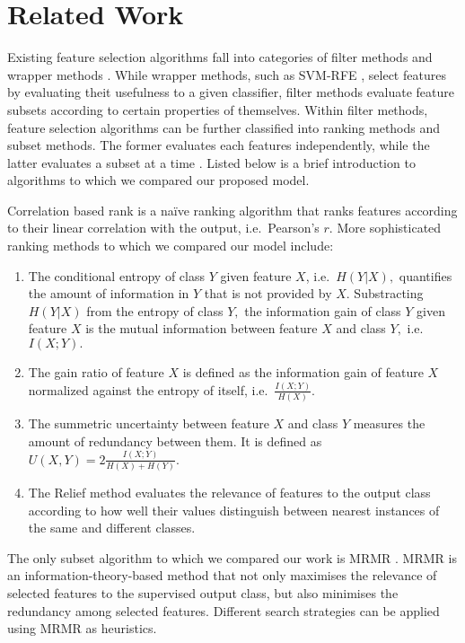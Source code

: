 \section{Related Work}

Existing feature selection algorithms fall into categories of filter
methods and wrapper methods \cite{guyon_jmlr03}. While
wrapper methods, such as SVM-RFE \cite{guyon2002gene}, select features
by evaluating theit usefulness to a given classifier, filter methods
evaluate feature subsets according to certain properties of
themselves. Within filter methods, feature selection algorithms can be
further classified into ranking methods and subset methods. The former
evaluates each features independently, while the latter evaluates a
subset at a time \cite{brown2012conditional}. Listed below is a brief
introduction to algorithms to which we compared our proposed model.

Correlation based rank is a na\"{i}ve ranking algorithm that ranks
features according to their linear correlation with the output,
i.e.\ Pearson's $r.$ More sophisticated ranking methods to which we
compared our model include:
\begin{enumerate}
\item The conditional entropy of class $Y$ given feature $X$,
  i.e.\ $H\left(Y|X\right),$ quantifies the amount of information in
  $Y$ that is not provided by $X.$ Substracting $H\left(Y|X\right)$
  from the entropy of class $Y,$ the information gain of class $Y$
  given feature $X$ is the mutual information between feature $X$ and
  class $Y,$ i.e.\ $I\left(X;Y\right).$
\item The gain ratio of feature $X$ is defined as the information gain
  of feature $X$ normalized against the entropy of itself,
  i.e.\ $\frac{I\left(X;Y\right)}{H\left(X\right)}.$
\item The summetric uncertainty between feature $X$ and class $Y$
  measures the amount of redundancy between them. It is defined as
  $U\left(X,Y\right)=2\frac{I\left(X;Y\right)}{H\left(X\right)+H\left(Y\right)}.$
\item The Relief method \cite{kira1992feature} evaluates the relevance
  of features to the output class according to how well their values
  distinguish between nearest instances of the same and different
  classes.
\end{enumerate}

The only subset algorithm to which we compared our work is MRMR
\cite{peng2005}. MRMR is an information-theory-based method
that not only maximises the relevance of selected features to the
supervised output class, but also minimises the redundancy among
selected features. Different search strategies can be applied using
MRMR as heuristics.

